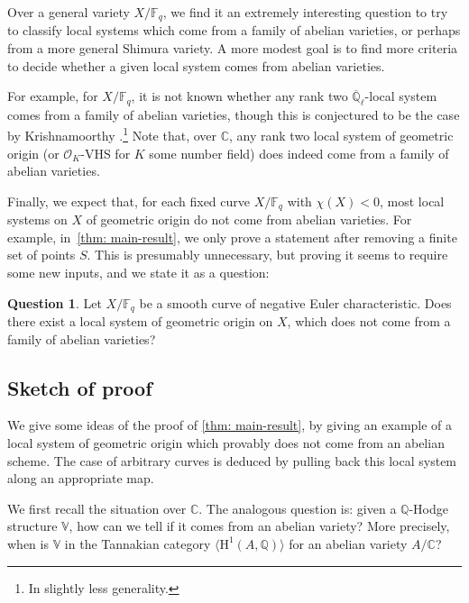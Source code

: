 \documentclass[JEP,XML,SOM,Unicode,published]{cedram}
\numberwithin{equation}{subsection}
\theoremstyle{definition}
\newtheorem{question}[thm]{Question}
\newcommand{\Qlbar}{\overline{\mathbb{Q}}_{\ell}}
\newcommand{\Q}{\mathbb Q}
\let\mc\mathcal
\let\mb\mathbb
\begin{document}
Over a general variety $X/\mb{F}_q$, we find it an extremely interesting question to try to classify local systems which come from a family of abelian varieties, or perhaps from a more general Shimura variety. A more modest goal is to find more criteria to decide whether a given local system comes from abelian varieties.

For example, for $X/\mb{F}_q$, it is not known whether any rank two $\Qlbar$-local system comes from a family of abelian varieties, though this is conjectured to be the case by Krishnamoorthy \cite[Conj.\,1.2]{Krishnamoorthy-Rank-2-Local-Systems-and-Barsotti-Tate-Groups}.\footnote{In slightly less generality.} Note that, over $\mb{C}$, any rank two local system of geometric origin (or $\mc{O}_K$-VHS for $K$ some number field) does indeed come from a family of abelian varieties.

Finally, we expect that, for each fixed curve $X/\mb{F}_q$ with $\chi(X)<0$, most local systems on $X$ of geometric origin do not come from abelian varieties. For example, in~\cref{thm: main-result}, we only prove a statement after removing a finite set of points $S$. This is presumably unnecessary, but proving it seems to require some new inputs, and we state it as a question:

\begin{question}
Let $X/\mb{F}_q$ be a smooth curve of negative Euler characteristic. Does there exist a local system of geometric origin on $X$, which does not come from a family of abelian varieties?
\end{question}

\subsection{Sketch of proof}
We give some ideas of the proof of \cref{thm: main-result}, by giving an example of a local system of geometric origin which provably does not come from an abelian scheme. The case of arbitrary curves is deduced by pulling back this local system along an appropriate map.

We first recall the situation over $\mb{C}$. The analogous question is: given a $\mb{Q}$-Hodge structure $\mb{V}$, how can we tell if it comes from an abelian variety? More precisely, when is $\mb{V}$ in the Tannakian category $\langle \mathrm{H}^1(A,\Q)\rangle$ for an abelian variety $A/\mb{C}$?
\end{document}
